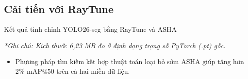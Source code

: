 \subsection{Cải tiến với RayTune}
\begin{frame}{Kết quả tinh chỉnh YOLO26-seg bằng RayTune và ASHA}
  \begin{table}
    \centering
    \caption{So sánh trước và sau tinh chỉnh siêu tham số}
    \small
  \end{table}

  \vspace{-0.1cm}
  {\scriptsize \textit{*Ghi chú: Kích thước 6,23 MB đo ở định dạng trọng số PyTorch (.pt) gốc.}}

  \vspace{0.15cm}
  \begin{itemize}
    \item[-] Phương pháp tìm kiếm kết hợp thuật toán loại bỏ sớm ASHA giúp tăng hơn 2\% mAP@50 trên cả hai miền dữ liệu.
  \end{itemize}
\end{frame}

